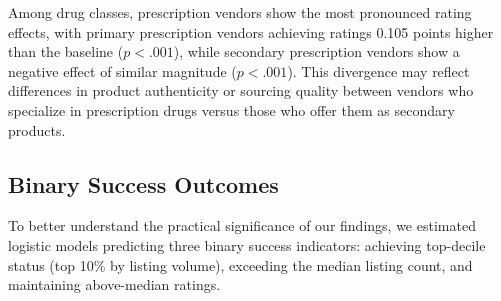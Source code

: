 \documentclass{article}
\begin{document}
Among drug classes, prescription vendors show the most pronounced rating effects, with primary prescription vendors achieving ratings 0.105 points higher than the baseline ($p < .001$), while secondary prescription vendors show a negative effect of similar magnitude ($p < .001$). This divergence may reflect differences in product authenticity or sourcing quality between vendors who specialize in prescription drugs versus those who offer them as secondary products.

\subsection{Binary Success Outcomes}

To better understand the practical significance of our findings, we estimated logistic models predicting three binary success indicators: achieving top-decile status (top 10\% by listing volume), exceeding the median listing count, and maintaining above-median ratings.
\end{document}
